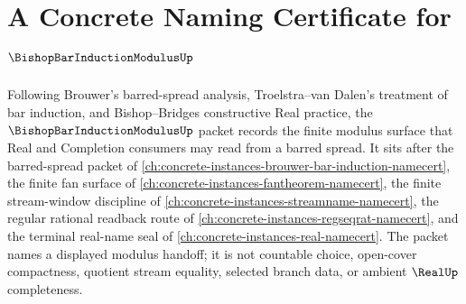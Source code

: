 \chapter{A Concrete Naming Certificate for $\BishopBarInductionModulusUp$}
\label{ch:concrete-instances-bishop-bar-induction-modulus-namecert}

Following Brouwer's barred-spread analysis, Troelstra--van Dalen's treatment of bar induction, and Bishop--Bridges constructive Real practice, the $\BishopBarInductionModulusUp$ packet records the finite modulus surface that Real and Completion consumers may read from a barred spread. It sits after the barred-spread packet of \autoref{ch:concrete-instances-brouwer-bar-induction-namecert}, the finite fan surface of \autoref{ch:concrete-instances-fantheorem-namecert}, the finite stream-window discipline of \autoref{ch:concrete-instances-streamname-namecert}, the regular rational readback route of \autoref{ch:concrete-instances-regseqrat-namecert}, and the terminal real-name seal of \autoref{ch:concrete-instances-real-namecert}. The packet names a displayed modulus handoff; it is not countable choice, open-cover compactness, quotient stream equality, selected branch data, or ambient $\RealUp$ completeness.

